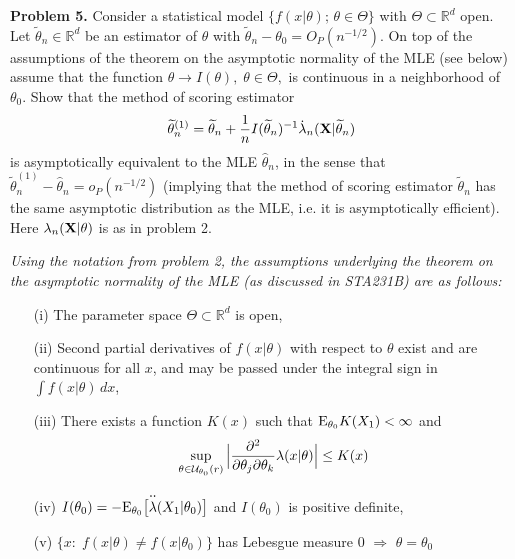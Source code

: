 \documentclass[12pt]{exam}
\newcommand{\R}{{\mathbb R}}
\begin{document}
\noindent
{\bf Problem 5.} Consider a statistical model $\{f(x|\theta);\,\theta \in \Theta\}$ with $\Theta \subset {\mathbb R}^d$ open. Let $\widetilde{\theta}_n \in \R^d$ be an estimator of $\theta$ with $\widetilde{\theta}_n - \theta_0 = O_P(n^{-1/2}).$ On top of the assumptions of the theorem on the asymptotic normality of the MLE (see below)  assume that the function $\theta \to I(\theta),\;\theta \in \Theta,$ is continuous in a neighborhood of $\theta_0$.  Show that the method of scoring estimator
%
$$\widetilde{\theta}_n^{(1)} = \widetilde{\theta}_n +  \frac{1}{n} I(\widetilde{\theta}_n)^{-1} \dot{\lambda}_n({\bf X}|\widetilde{\theta}_n)$$
%
is asymptotically equivalent to the MLE $\widehat{\theta}_n$, in the sense that $\widetilde{\theta}^{(1)}_n - \widehat{\theta}_n = o_P(n^{-1/2})$ (implying that the method of scoring estimator $\widetilde{\theta}_n$ has the same asymptotic distribution as the MLE, i.e. it is asymptotically efficient). Here $\lambda_n({\bf X}|\theta)$ is as in problem 2. \\

\vspace*{1cm}
\noindent
{\em Using the notation from problem 2, the assumptions underlying the theorem on the asymptotic normality of the MLE (as discussed in STA231B) are as follows:
%
\begin{itemize}
\item[(i)] The parameter space $\Theta \subset \R^d$ is open,
%
\item[(ii)] Second partial derivatives of $f(x|\theta)$ with respect to $\theta$ exist and are continuous for all $x$, and may be passed under the integral sign in $\int f(x|\theta)\,dx$,
%
\item[(iii)] There exists a function $K(x)$ such that ${\rm E}_{\theta_0}K(X_1) < \infty$ and 
%
$$\sup_{\theta \in {\cal U}_{\theta_0}(r)}\Big| \frac{\partial^2}{\partial \theta_j \partial \theta_k}\lambda(x|\theta)\Big| \le K(x)$$
%
\item[(iv)] $I(\theta_0) = -{\rm E}_{\theta_0}\big[\overset{\boldsymbol{\cdot\cdot}}{\lambda}(X_1|\theta_0)\big]$ and $I(\theta_0)$ is positive definite,
%
\item[(v)] $\{x:\;f(x|\theta) \ne f(x|\theta_0)\}$ has Lebesgue measure $0$ \;\;$\Rightarrow$\;\; $\theta = \theta_0$
\end{itemize}
}
\end{document}
